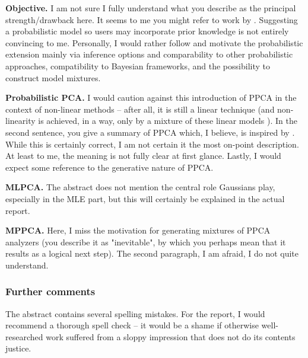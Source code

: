 \documentclass[12pt]{article}
\newenvironment{tight_itemize}{
\begin{itemize}
  \setlength{\itemsep}{0pt}
  \setlength{\parskip}{0pt}
}{\end{itemize}}
\begin{document}
\begin{tight_itemize}
  \item \textbf{Objective.} I am not sure I fully understand what you describe 
  as the principal strength/drawback here.
  It seems to me you might refer to work by \citet{shlens2005}. 
  Suggesting a probabilistic model so users may incorporate prior 
  knowledge is not entirely convincing to me.
  Personally, I would rather follow \citet{tippingbishop1999} and motivate the 
  probabilistic extension mainly via inference options and comparability to 
  other probabilistic approaches, compatibility to Bayesian frameworks, and the 
  possibility to construct model mixtures.
  \item \textbf{Probabilistic PCA.} 
  I would caution against this introduction of PPCA in the context of non-linear 
  methods -- after all, it is still a linear technique (and non-linearity is 
  achieved, in a way, only by a mixture of these linear models 
  \citep{tippingbishop1999}).
  In the second sentence, you give a summary of PPCA which, I believe, is 
  inspired by \citet{bishop2006}. 
  While this is certainly correct, I am not certain it the most on-point 
  description. 
  At least to me, the meaning is not fully clear at first glance.
  Lastly, I would expect some reference to the generative nature of PPCA.
  \item \textbf{MLPCA.} The abstract does not mention the central role Gaussians 
  play, especially in the MLE part, but this will certainly be explained in the 
  actual report.
  \item \textbf{MPPCA.} Here, I miss the motivation for generating mixtures of 
  PPCA analyzers (you describe it as "inevitable", by which you perhaps mean 
  that it results as a logical next step).
  The second paragraph, I am afraid, I do not quite understand.
\end{tight_itemize}

\subsubsection*{Further comments}

The abstract contains several spelling mistakes. 
For the report, I would recommend a thorough spell check -- it would be a shame 
if otherwise well-researched work suffered from a sloppy impression that does 
not do its contents justice.


\RaggedRight


\newpage

\end{document}
